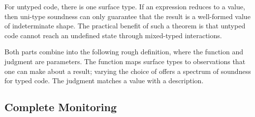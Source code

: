 \documentclass[ twoside,open=right,titlepage,numbers=noenddot,headinclude,%
                footinclude=true,cleardoublepage=empty,abstract=off,
                BCOR=5mm,paper=a4,fontsize=11pt,%
                ngerman,american,%
                parts,pdfspacing]{scrreprt}
\newcommand{\Ssubsubsection}[2]{\subsubsection[#1]{#2}}
\renewcommand{\Ssubsubsection}[2]{\subsection[#1]{#2}}
\begin{document}
For untyped code, there is one surface type.
If an expression reduces to a value, then uni{-}type soundness can only guarantee
 that the result is a well{-}formed value of indeterminate shape.
The practical benefit of such a theorem is that untyped code cannot reach
 an undefined state through mixed{-}typed interactions.

Both parts combine into the following rough definition, where the
 function \relax{$\sXproj$} and judgment \relax{$\sWTX$} are parameters.
The function maps surface types to observations that one can make about a result;
 varying the choice of \relax{$\sXproj$} offers a spectrum of soundness for typed code.
The judgment \relax{$\sWTX$} matches a value with a description.


\Ssubsubsection{Complete Monitoring}{Complete Monitoring}\label{t:x28part_x22secx3adesignx3acmx22x29}
\end{document}
